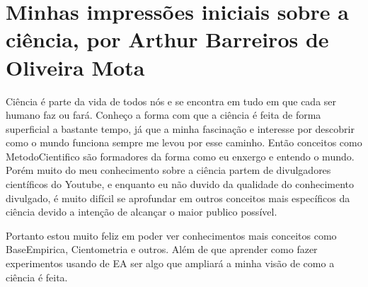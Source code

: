 \section{Minhas impressões iniciais sobre a ciência, por Arthur Barreiros de Oliveira Mota}

Ciência é parte da vida de todos nós e se encontra em tudo em que cada ser humano faz ou fará. Conheço a forma com que a ciência é feita de forma superficial a  bastante tempo, já que a minha fascinação e interesse por descobrir como o mundo funciona sempre me levou por esse caminho. Então conceitos como \gls{MetodoCientifico} são formadores da forma como eu enxergo e entendo o mundo. Porém muito do meu conhecimento sobre a ciência partem de divulgadores científicos do Youtube, e enquanto eu não duvido da qualidade do conhecimento divulgado, é muito difícil se aprofundar em outros conceitos mais específicos da ciência devido a intenção de alcançar o maior publico possível.

Portanto estou muito feliz em poder ver conhecimentos mais conceitos como \gls{BaseEmpirica},   \gls{Cientometria} e outros. Além de que aprender como fazer experimentos usando de \gls{EA} ser algo que ampliará a minha visão de como a ciência é feita.